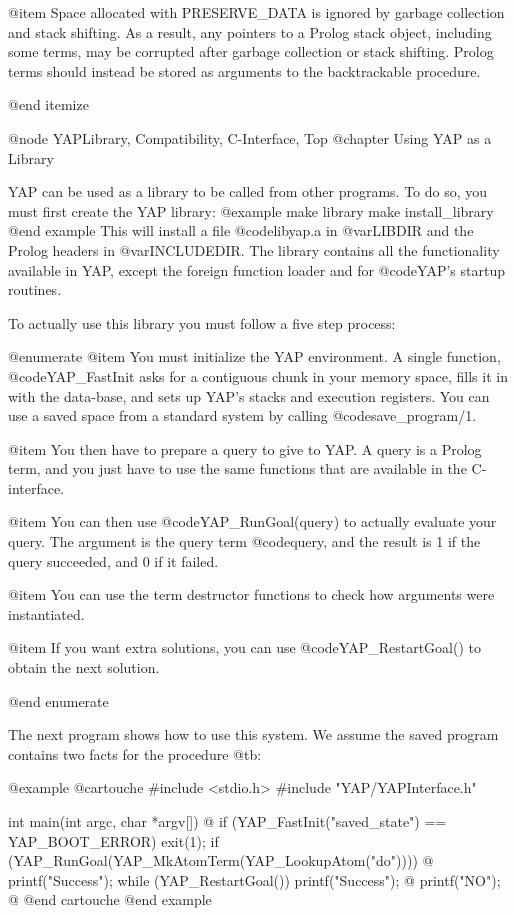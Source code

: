 {{{{{{{{{@item Space allocated with PRESERVE_DATA is ignored by garbage
collection and stack shifting. As a result, any pointers to a Prolog
stack object, including some terms, may be corrupted after garbage
collection or stack shifting. Prolog terms should instead be stored as
arguments to the backtrackable procedure.

@end itemize

@node YAPLibrary, Compatibility, C-Interface, Top
@chapter Using YAP as a Library

YAP can be used as a library to be called from other
programs. To do so, you must first create the YAP library:
@example
make library
make install_library
@end example
This will install a file @code{libyap.a} in @var{LIBDIR} and the Prolog
headers in @var{INCLUDEDIR}. The library contains all the functionality
available in YAP, except the foreign function loader and for
@code{YAP}'s startup routines.

To actually use this library you must follow a five step process:

@enumerate
@item
 You must initialize the YAP environment. A single function,
@code{YAP_FastInit} asks for a contiguous chunk in your memory space, fills
it in with the data-base, and sets up YAP's stacks and
execution registers. You can use a saved space from a standard system by
calling @code{save_program/1}.
     
@item You then have to prepare a query to give to
YAP. A query is a Prolog term, and you just have to use the same
functions that are available in the C-interface.

@item You can then use @code{YAP_RunGoal(query)} to actually evaluate your
query. The argument is the query term @code{query}, and the result is 1
if the query succeeded, and 0 if it failed.

@item You can use the term destructor functions to check how
arguments were instantiated.

@item If you want extra solutions, you can use
@code{YAP_RestartGoal()} to obtain the next solution.

@end enumerate

The next program shows how to use this system. We assume the saved
program contains two facts for the procedure @t{b}:

@example
@cartouche
#include <stdio.h>
#include "YAP/YAPInterface.h"


int
main(int argc, char *argv[]) @{
  if (YAP_FastInit("saved_state") == YAP_BOOT_ERROR)
    exit(1);
  if (YAP_RunGoal(YAP_MkAtomTerm(YAP_LookupAtom("do")))) @{
    printf("Success\n");
    while (YAP_RestartGoal())
      printf("Success\n");
  @}
  printf("NO\n");
@}
@end cartouche
@end example

}}}}}}}}}

